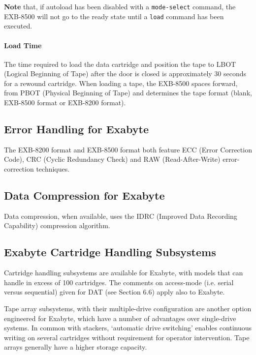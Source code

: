 \documentclass[11pt]{article}
\begin{document}
{\bf Note} that, if autoload has been disabled with a {\tt mode-select}
command, the EXB-8500 will not go to the ready state until a {\tt load} command
has been executed.

\paragraph {Load Time}

The time required to load the data cartridge and position the tape to LBOT
(Logical Beginning of Tape) after the door is closed is approximately 30
seconds for a rewound cartridge.  When loading a tape, the EXB-8500 spaces
forward, from PBOT (Physical Beginning of Tape) and determines the tape
format (blank, EXB-8500 format or EXB-8200 format).

\subsection {Error Handling for Exabyte}

The EXB-8200 format and EXB-8500 format both feature ECC (Error Correction
Code), CRC (Cyclic Redundancy Check) and RAW (Read-After-Write)
error-correction techniques.

\subsection {Data Compression for Exabyte}

Data compression, when available, uses the IDRC (Improved Data Recording
Capability) compression algorithm.

\subsection {Exabyte Cartridge Handling Subsystems}

Cartridge handling subsystems are available for Exabyte, with models that
can handle in excess of 100 cartridges. The comments on access-mode (i.e.
serial versus sequential) given for DAT (see Section 6.6) apply also to Exabyte.

Tape array subsystems, with their multiple-drive configuration are another
option engineered for Exabyte, which have a number of advantages over
single-drive systems. In common with stackers, `automatic drive switching'
enables continuous writing on several cartridges without requirement for
operator intervention. Tape arrays generally have a higher storage capacity.
\end{document}
